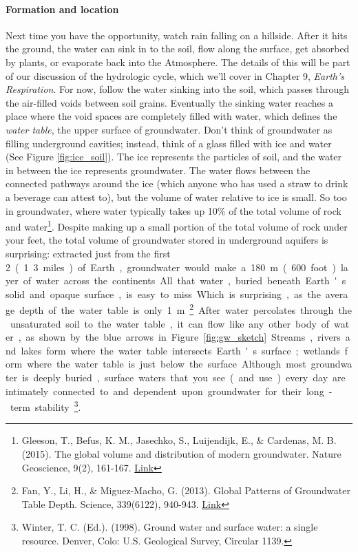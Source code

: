 \paragraph{Formation and location}
Next time you have the opportunity, watch rain falling on a hillside. After it hits the ground, the water can sink in to the soil, flow along the surface, get absorbed by plants, or evaporate back into the Atmosphere. The details of this will be part of our discussion of the hydrologic cycle, which we'll cover in Chapter 9, \textit{Earth's Respiration}. For now, follow the water sinking into the soil, which passes through the air-filled voids between soil grains. Eventually the sinking water reaches a place where the void spaces are completely filled with water, which defines the \emph{water table}, the upper surface of groundwater. Don't think of groundwater as filling underground cavities; instead, think of a glass filled with ice and water (See Figure \ref{fig:ice_soil}). The ice represents the particles of soil, and the water in between the ice represents groundwater. The water flows between the connected pathways around the ice (which anyone who has used a straw to drink a beverage can attest to), but the volume of water relative to ice is small. So too in groundwater, where water typically takes up 10\% of the total volume of rock and water\footnote{Gleeson, T., Befus, K. M., Jasechko, S., Luijendijk, E., \& Cardenas, M. B. (2015). The global volume and distribution of modern groundwater. Nature Geoscience, 9(2), 161-167. \href{https://doi.org/10.1038/ngeo2590}{Link}}. Despite making up a small portion of the total volume of rock under your feet, the total volume of groundwater stored in underground aquifers is surprising: extracted just from the first \SI{2}[{\kilo}{\metre}] (1.3 miles) of Earth, groundwater would make a \SI{180}{\metre} (600 foot) layer of water across the continents. All that water, buried beneath Earth's solid and opaque surface, is easy to miss.

Which is surprising, as the average depth of the water table is only \SI{1}{\metre}\footnote{Fan, Y., Li, H., \& Miguez-Macho, G. (2013). Global Patterns of Groundwater Table Depth. Science, 339(6122), 940-943. \href{https://doi.org/DOI: 10.1126/science.1229881}{Link}}. After water percolates through the unsaturated soil to the water table, it can flow like any other body of water, as shown by the blue arrows in Figure \ref{fig:gw_sketch}. Streams, rivers and lakes form where the water table intersects Earth's surface; wetlands form where the water table is just below the surface. Although most groundwater is deeply buried, surface waters that you see (and use) every day are intimately connected to and dependent upon groundwater for their long-term stability\footnote{Winter, T. C. (Ed.). (1998). Ground water and surface water: a single resource. Denver, Colo: U.S. Geological Survey, Circular 1139.}. 

